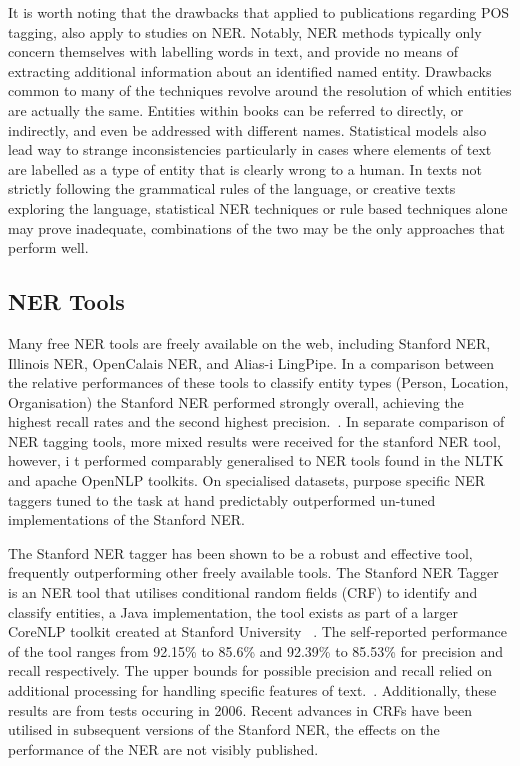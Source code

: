 \documentclass[10pt]{report}
\begin{document}
It is worth noting that the drawbacks that applied to publications regarding POS tagging, also apply to studies on NER. Notably, NER methods typically only concern themselves with labelling words in text, and provide no means of extracting additional information about an identified named entity. Drawbacks common to many of the techniques revolve around the resolution of which entities are actually the same. Entities within books can be referred to directly, or indirectly, and even be addressed with different names. Statistical models also lead way to strange inconsistencies particularly in cases where elements of text are labelled as a type of entity that is clearly wrong to a human. In texts not strictly following the grammatical rules of the language, or creative texts exploring the language, statistical NER techniques or rule based techniques alone may prove inadequate, combinations of the two may be the only approaches that perform well.

 \subsection{NER Tools}
 Many free NER tools are freely available on the web, including Stanford NER, Illinois NER, OpenCalais NER, and Alias-i LingPipe. In a comparison between the relative performances of these tools to classify entity types (Person, Location, Organisation) the Stanford NER performed strongly overall, achieving the highest recall rates and the second highest precision.~\cite{Atdag2013-qo}. In separate comparison of NER tagging tools, more mixed results were received for the stanford NER tool, however, i
 t performed comparably generalised to NER tools found in the NLTK and apache OpenNLP toolkits. On specialised datasets, purpose specific NER taggers tuned to the task at hand predictably outperformed un-tuned implementations of the Stanford NER.
 
The Stanford NER tagger has been shown to be a robust and effective tool, frequently outperforming other freely available tools. The Stanford NER Tagger is an NER tool that utilises conditional random fields (CRF) to identify and classify entities, a Java implementation, the tool exists as part of a larger CoreNLP toolkit created at Stanford University  ~\cite{Finkel2005-uz}. The self-reported performance of the tool ranges from 92.15\% to 85.6\% and 92.39\% to 85.53\% for precision and recall respectively. The upper bounds for possible precision and recall relied on additional processing for handling specific features of text.~\cite{noauthor_undated-ik}. Additionally, these results are from tests occuring in 2006. Recent advances in CRFs have been utilised in subsequent versions of the Stanford NER, the effects on the performance of the NER are not visibly published.
\end{document}
